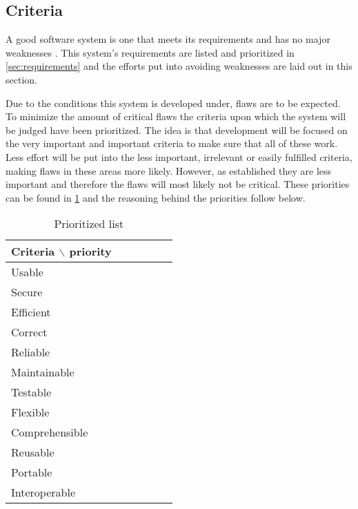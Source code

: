 \subsection{Criteria}\label{sec:architecturecriteria}
A good software system is one that meets its requirements and has no major weaknesses \citep[p.~179]{Rod-Aalborg}.
This system's requirements are listed and prioritized in \ref{sec:requirements} and the efforts put into avoiding weaknesses are laid out in this section.

Due to the conditions this system is developed under, flaws are to be expected.
To minimize the amount of critical flaws the criteria \citep[p.~180]{Rod-Aalborg} upon which the system will be judged have been prioritized.
The idea is that development will be focused on the very important and important criteria to make sure that all of these work.
Less effort will be put into the less important, irrelevant or easily fulfilled criteria, making flaws in these areas more likely.
However, as established they are less important and therefore the flaws will most likely not be critical.
These priorities can be found in \cref{fig:criteria} and the reasoning behind the priorities follow below.



\begin{table}[H]
	\begin{center}
		\begin{tabular}{|l|c|c|c|c|c|}
			\hline
			Criteria $\backslash$ priority & \rotatebox{90}{Very important} &  \rotatebox{90}{Important} & \rotatebox{90}{Less important} & \rotatebox{90}{Irrelevant} & \rotatebox{90}{Easily fulfilled}\\
			\hline
			Usable & \xmark & & & & \\
			\hline
			Secure & & & & \xmark & \\
			\hline
			Efficient & & & & & \xmark \\
			\hline
			Correct & & \xmark & & & \\
			\hline
			Reliable & \xmark & & & & \\
			\hline
			Maintainable & & & \xmark & & \\
			\hline
			Testable & & \xmark & & & \\
			\hline
			Flexible & & & & \xmark & \\
			\hline
			Comprehensible & & \xmark & & & \\
			\hline
			Reusable & & & \xmark & & \\
			\hline
			Portable & & & & \xmark & \\
			\hline
			Interoperable & & & & \xmark & \\
			\hline
		\end{tabular}
	\end{center}
	\caption{Prioritized list}\label{fig:criteria}
\end{table}


